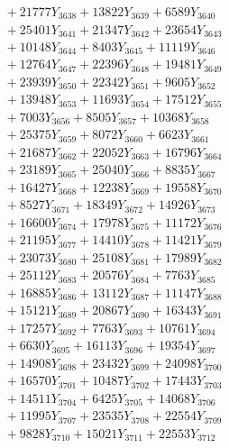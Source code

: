 \documentclass[a4paper,10pt]{article}
\begin{document}
{\begin{align}
&\;  + 21777 Y_{3638} + 13822 Y_{3639} + 6589 Y_{3640} \\[0.3ex]
&\;  + 25401 Y_{3641} + 21347 Y_{3642} + 23654 Y_{3643} \\[0.3ex]
&\;  + 10148 Y_{3644} + 8403 Y_{3645} + 11119 Y_{3646} \\[0.3ex]
&\;  + 12764 Y_{3647} + 22396 Y_{3648} + 19481 Y_{3649} \\[0.3ex]
&\;  + 23939 Y_{3650} + 22342 Y_{3651} + 9605 Y_{3652} \\[0.3ex]
&\;  + 13948 Y_{3653} + 11693 Y_{3654} + 17512 Y_{3655} \\[0.3ex]
&\;  + 7003 Y_{3656} + 8505 Y_{3657} + 10368 Y_{3658} \\[0.5ex]\allowbreak
&\;  + 25375 Y_{3659} + 8072 Y_{3660} + 6623 Y_{3661} \\[0.3ex]
&\;  + 21687 Y_{3662} + 22052 Y_{3663} + 16796 Y_{3664} \\[0.3ex]
&\;  + 23189 Y_{3665} + 25040 Y_{3666} + 8835 Y_{3667} \\[0.3ex]
&\;  + 16427 Y_{3668} + 12238 Y_{3669} + 19558 Y_{3670} \\[0.3ex]
&\;  + 8527 Y_{3671} + 18349 Y_{3672} + 14926 Y_{3673} \\[0.3ex]
&\;  + 16600 Y_{3674} + 17978 Y_{3675} + 11172 Y_{3676} \\[0.3ex]
&\;  + 21195 Y_{3677} + 14410 Y_{3678} + 11421 Y_{3679} \\[0.3ex]
&\;  + 23073 Y_{3680} + 25108 Y_{3681} + 17989 Y_{3682} \\[0.3ex]
&\;  + 25112 Y_{3683} + 20576 Y_{3684} + 7763 Y_{3685} \\[0.3ex]
&\;  + 16885 Y_{3686} + 13112 Y_{3687} + 11147 Y_{3688} \\[0.5ex]\allowbreak
&\;  + 15121 Y_{3689} + 20867 Y_{3690} + 16343 Y_{3691} \\[0.3ex]
&\;  + 17257 Y_{3692} + 7763 Y_{3693} + 10761 Y_{3694} \\[0.3ex]
&\;  + 6630 Y_{3695} + 16113 Y_{3696} + 19354 Y_{3697} \\[0.3ex]
&\;  + 14908 Y_{3698} + 23432 Y_{3699} + 24098 Y_{3700} \\[0.3ex]
&\;  + 16570 Y_{3701} + 10487 Y_{3702} + 17443 Y_{3703} \\[0.3ex]
&\;  + 14511 Y_{3704} + 6425 Y_{3705} + 14068 Y_{3706} \\[0.3ex]
&\;  + 11995 Y_{3707} + 23535 Y_{3708} + 22554 Y_{3709} \\[0.3ex]
&\;  + 9828 Y_{3710} + 15021 Y_{3711} + 22553 Y_{3712} \\[0.3ex]

\end{align}}
\end{document}
